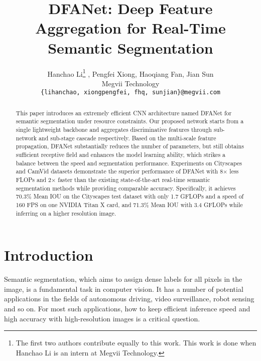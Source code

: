 \documentclass[10pt,twocolumn,letterpaper]{article}
\begin{document}
\title{DFANet: Deep Feature Aggregation for Real-Time Semantic Segmentation}

\author{Hanchao Li\thanks  {The first two authors contribute equally to this work. This work is done when Hanchao Li is an intern at Megvii Technology.} , Pengfei Xiong\footnotemark[1] , Haoqiang Fan, Jian Sun\\
Megvii Technology\\
{\tt\small \{lihanchao, xiongpengfei, fhq, sunjian\}@megvii.com}
}



\maketitle


\begin{abstract}
   This paper introduces an extremely efficient CNN architecture named DFANet for semantic segmentation under resource constraints. Our proposed network starts from a single lightweight backbone and aggregates discriminative features through sub-network and sub-stage cascade respectively. Based on the multi-scale feature propagation, DFANet substantially reduces the number of parameters, but still obtains sufficient receptive field and enhances the model learning ability, which strikes a balance between the speed and segmentation performance. Experiments on Cityscapes and CamVid datasets demonstrate the superior performance of DFANet with 8$\times$ less FLOPs and 2$\times$ faster than the existing state-of-the-art real-time semantic segmentation methods while providing comparable accuracy. Specifically, it achieves 70.3\% Mean IOU on the Cityscapes test dataset with only 1.7 GFLOPs and a speed of 160 FPS on one NVIDIA Titan X card, and 71.3\% Mean IOU with 3.4 GFLOPs while inferring on a higher resolution image.
\end{abstract}



\section{Introduction}
Semantic segmentation, which aims to assign dense labels for all pixels in the image, is a fundamental task in computer vision. It has a number of potential applications in the fields of autonomous driving, video surveillance, robot sensing and so on. For most such applications, how to keep efficient inference speed and high accuracy with high-resolution images is a critical question.
\end{document}
